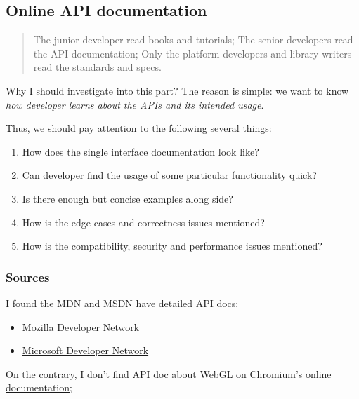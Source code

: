 \documentclass[]{article}
\begin{document}
\subsection{Online API documentation}\label{online-api-documentation}

\begin{quote}
The junior developer read books and tutorials; The senior developers
read the API documentation; Only the platform developers and library
writers read the standards and specs.
\end{quote}

Why I should investigate into this part? The reason is simple: we want
to know \emph{how developer learns about the APIs and its intended
usage}.

Thus, we should pay attention to the following several things:

\begin{enumerate}
\def\labelenumi{\arabic{enumi}.}
\itemsep1pt\parskip0pt
\item
  How does the single interface documentation look like?
\item
  Can developer find the usage of some particular functionality quick?
\item
  Is there enough but concise examples along side?
\item
  How is the edge cases and correctness issues mentioned?
\item
  How is the compatibility, security and performance issues mentioned?
\end{enumerate}

\subsubsection{Sources}\label{sources}

I found the MDN and MSDN have detailed API docs:

\begin{itemize}
\itemsep1pt\parskip0pt
\item
  \href{https://developer.mozilla.org/en-US/docs/Web/API/WebGL_API}{Mozilla
  Developer Network}
\item
  \href{https://msdn.microsoft.com/en-us/library/dn621085(v=vs.85).aspx}{Microsoft
  Developer Network}
\end{itemize}

On the contrary, I don't find API doc about WebGL on
\href{https://www.chromium.org/developers}{Chromium's online
documentation};
\end{document}
